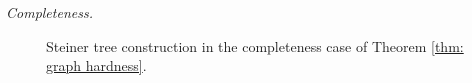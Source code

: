 \documentclass{theoretics}
\newcommand{\1}{\textbf{1}}
\begin{document}
\begin{paragraph}{\textit{Completeness.}}
\begin{figure}[!ht]




     \caption{Steiner tree construction in the completeness case of Theorem \ref{thm: graph hardness}.}
     \label{fig: DST completeness graph}
 \end{figure}
 \end{paragraph}
 
\end{document}

